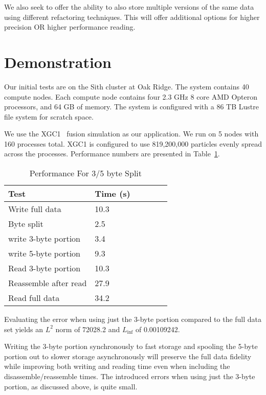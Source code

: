 \documentclass[letterpaper,twocolumn,10pt]{article}
\begin{document}
We also seek to offer the ability to also store multiple versions of the same
data using different refactoring techniques. This will offer additional options
for higher precision OR higher performance reading.

\section{Demonstration}
\label{sec:evaluation}

Our initial tests are on the Sith cluster at Oak Ridge. The system contains 40
compute nodes. Each compute node contains four 2.3 GHz 8 core AMD Opteron
processors, and 64 GB of memory. The system is configured with a 86 TB Lustre
file system for scratch space.

We use the XGC1~\cite{ku:2008:xgc1} fusion simulation as our application. We
run on 5 nodes with 160 processes total. XGC1 is configured to use 819,200,000
particles evenly spread across the processes. Performance numbers are
presented in Table~\ref{tab:performance}.

\begin{table}[tbp]
\centering
\caption{Performance For 3/5 byte Split}
\label{tab:performance}
\begin{tabular}{|l|l|l|l|l|l|}
\hline
Test & Time (s)\\
\hline
Write full data & 10.3 \\
\hline
Byte split & 2.5 \\
\hline
write 3-byte portion & 3.4 \\
\hline
write 5-byte portion & 9.3 \\
\hline
\hline
Read 3-byte portion & 10.3 \\
\hline
Reassemble after read & 27.9 \\
\hline
Read full data & 34.2 \\
\hline
\end{tabular}
\end{table}

Evaluating the error when using just the 3-byte portion compared to the full
data set yields an $L^2$ norm of 72028.2 and $L_{\inf}$ of 0.00109242.

Writing the 3-byte portion synchronously to fast storage and spooling the
5-byte portion out to slower storage asynchronously will preserve the full data
fidelity while improving both writing and reading time even when including the
disassemble/reassemble times. The introduced errors when using just the 3-byte
portion, as discussed above, is quite small.
\end{document}

